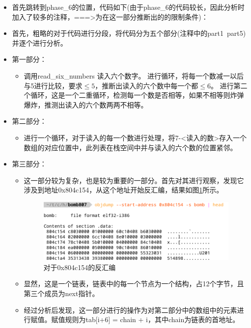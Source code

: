 \begin{itemize}
	\item 首先跳转到phase\_6的位置，代码如下(由于phase\_6的代码较长，因此分析时加入了较多的注释，===>为在这一部分推断出的的限制条件)：
		\begin{codeFont}
			
		\end{codeFont}
	\item 首先，粗略的对于代码进行分段，将代码分为五个部分(注释中的part1~part5)并逐个进行分析。
	\item 第一部分：
		\begin{itemize}
			\item 调用read\_six\_numbers 读入六个数字。
				进行循环，将每一个数减一以后与5进行比较，要求$\leqslant 5$，推断出读入的六个数中每一个都$\leqslant 6$。
				进行第二个循环，这是一个二重循环，检测每一个数是否相等，如果不相等则炸弹爆炸，推测出读入的六个数两两不相等。
		\end{itemize}
	\item 第二部分：
		\begin{itemize}
			\item 进行一个循环，对于读入的每一个数进行处理，将7-<读入的数>存入一个数组的对应位置中，此列表在栈空间中并与读入的六个数的位置紧邻。
		\end{itemize}
	\item 第三部分：
		\begin{itemize}
			\item 这一部分较为复杂，也是较为重要的一部分。首先对其进行观察，发现它涉及到地址0x804c154，从这个地址开始反汇编，结果如图\ref{fig:fig12}所示。
				\begin{figure}[H]
					\centering
					\includegraphics[width=0.95\linewidth]{resources/fig12.png}
					\caption{对于0x804c154的反汇编}
					\label{fig:fig12}
				\end{figure}
			\item 显然，这是一个链表，链表中的每一个节点为一个结构，占12个字节，且第三个成员为next指针。
			\item 经过分析后发现，这一部分进行的操作为对第二部分中的数组中的元素进行赋值。赋值规则为tab[i+6] = chain + i，其中chain为链表的首地址。

\end{itemize}
\end{itemize}

